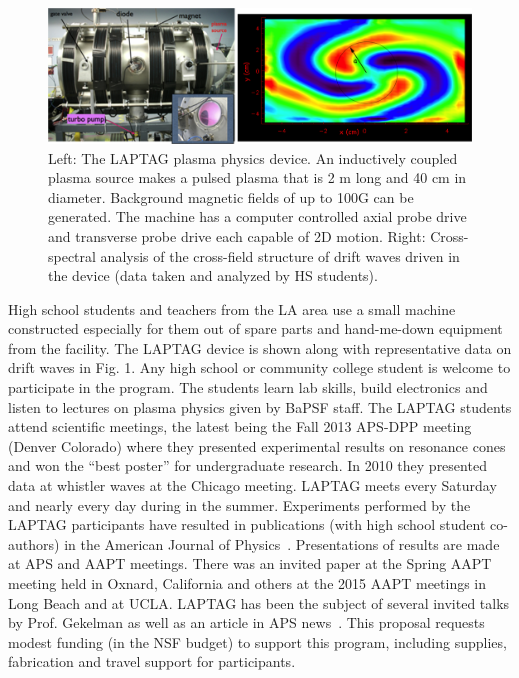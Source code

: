 \documentclass[11pt]{article}
\renewcommand{\cite}{\citep}
\begin{document}
\begin{figure}[!htbp]
\centerline{
\includegraphics[width=6.0truein]{laptag_fig}}
\caption{Left: The LAPTAG plasma physics device.  An 
inductively coupled plasma source makes a pulsed plasma that is 2 m long and 40 cm in 
diameter. Background magnetic fields of up to 100G can be generated.  The machine has a computer controlled 
axial probe drive and transverse probe drive each 
capable of 2D motion. Right: Cross-spectral analysis of the
cross-field structure of drift waves driven in the device (data taken
and analyzed by HS students).}\label{laptag}
\end{figure}

High school students and teachers from the LA area use a small machine
constructed especially for them out of spare parts and hand-me-down
equipment from the facility.  The LAPTAG device is shown along with
representative data on drift waves in Fig. 1.
Any high school or community college student is welcome to participate
in the program.  The students learn lab skills, build electronics and
listen to lectures on plasma physics given by BaPSF staff. The LAPTAG
students attend scientific meetings, the latest being the Fall 2013
APS-DPP meeting (Denver Colorado) where they presented experimental
results on resonance cones and won the ``best poster'' for
undergraduate research.  In 2010 they presented data at whistler waves
at the Chicago meeting.  LAPTAG meets every Saturday and nearly every
day during in the summer. Experiments performed by the LAPTAG
participants have resulted in publications (with high school student
co-authors) in the American Journal of
Physics~\cite{gekelman:2007,gekelman:2011}.  Presentations of results
are made at APS and AAPT meetings. There was an invited paper at the
Spring AAPT meeting held in Oxnard, California and others at the 2015
AAPT meetings in Long Beach and at UCLA.  LAPTAG has been the subject
of several invited talks by Prof. Gekelman as well as an article in
APS news~\cite{gekelman2002laptag}.  This proposal requests modest
funding (in the NSF budget) to support this program, including
supplies, fabrication and travel support for participants.
\end{document}
